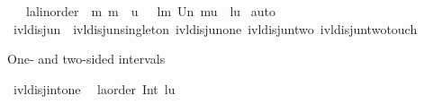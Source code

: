 \begin{isabellebody}
\ \ {\isachardoublequoteopen}{\isacharbrackleft}{\kern0pt}{\isacharbar}{\kern0pt}\ {\isacharparenleft}{\kern0pt}l{\isacharcolon}{\kern0pt}{\isacharcolon}{\kern0pt}{\isacharprime}{\kern0pt}a{\isacharcolon}{\kern0pt}{\isacharcolon}{\kern0pt}linorder{\isacharparenright}{\kern0pt}\ {\isasymle}\ m{\isacharsemicolon}{\kern0pt}\ m\ {\isasymle}\ u\ {\isacharbar}{\kern0pt}{\isacharbrackright}{\kern0pt}\ {\isacharequal}{\kern0pt}{\isacharequal}{\kern0pt}{\isachargreater}{\kern0pt}\ {\isacharbraceleft}{\kern0pt}l{\isachardot}{\kern0pt}{\isachardot}{\kern0pt}m{\isacharbraceright}{\kern0pt}\ Un\ {\isacharbraceleft}{\kern0pt}m{\isachardot}{\kern0pt}{\isachardot}{\kern0pt}u{\isacharbraceright}{\kern0pt}\ {\isacharequal}{\kern0pt}\ {\isacharbraceleft}{\kern0pt}l{\isachardot}{\kern0pt}{\isachardot}{\kern0pt}u{\isacharbraceright}{\kern0pt}{\isachardoublequoteclose}\isanewline
%
\isadelimproof
%
\endisadelimproof
%
\isatagproof
{}\isamarkupfalse%
\ auto%
\endisatagproof
{\isafoldproof}%
%
\isadelimproof
\isanewline
%
\endisadelimproof
\isanewline
{}\isamarkupfalse%
\ ivl{\isacharunderscore}{\kern0pt}disj{\isacharunderscore}{\kern0pt}un\ {\isacharequal}{\kern0pt}\ ivl{\isacharunderscore}{\kern0pt}disj{\isacharunderscore}{\kern0pt}un{\isacharunderscore}{\kern0pt}singleton\ ivl{\isacharunderscore}{\kern0pt}disj{\isacharunderscore}{\kern0pt}un{\isacharunderscore}{\kern0pt}one\ ivl{\isacharunderscore}{\kern0pt}disj{\isacharunderscore}{\kern0pt}un{\isacharunderscore}{\kern0pt}two\ ivl{\isacharunderscore}{\kern0pt}disj{\isacharunderscore}{\kern0pt}un{\isacharunderscore}{\kern0pt}two{\isacharunderscore}{\kern0pt}touch%
\isadelimdocument
%
\endisadelimdocument
%
\isatagdocument
%
\isamarkuptrue%
%
\endisatagdocument
{\isafolddocument}%
%
\isadelimdocument
%
\endisadelimdocument
%
\begin{isamarkuptext}%
One- and two-sided intervals%
\end{isamarkuptext}\isamarkuptrue%
\isamarkupfalse%
\ ivl{\isacharunderscore}{\kern0pt}disj{\isacharunderscore}{\kern0pt}int{\isacharunderscore}{\kern0pt}one{\isacharcolon}{\kern0pt}\isanewline
\ \ {\isachardoublequoteopen}{\isacharbraceleft}{\kern0pt}{\isachardot}{\kern0pt}{\isachardot}{\kern0pt}l{\isacharcolon}{\kern0pt}{\isacharcolon}{\kern0pt}{\isacharprime}{\kern0pt}a{\isacharcolon}{\kern0pt}{\isacharcolon}{\kern0pt}order{\isacharbraceright}{\kern0pt}\ Int\ {\isacharbraceleft}{\kern0pt}l{\isacharless}{\kern0pt}{\isachardot}{\kern0pt}{\isachardot}{\kern0pt}{\isacharless}{\kern0pt}u{\isacharbraceright}{\kern0pt}\ {\isacharequal}{\kern0pt}\ {\isacharbraceleft}{\kern0pt}{\isacharbraceright}{\kern0pt}{\isachardoublequoteclose}\isanewline

\end{isabellebody}
